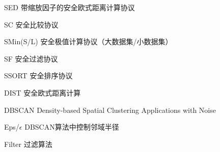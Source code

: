 \begin{denotation}
\item[SED] 带缩放因子的安全欧式距离计算协议
\item[SC] 安全比较协议
\item[SMin(S/L)] 安全极值计算协议（大数据集/小数据集）
\item[SF] 安全过滤协议
\item[SSORT] 安全排序协议
\item[DIST] 安全欧式距离计算
\item[DBSCAN] Density-based Spatial Clustering Applications with Noise
\item[Eps/$ \epsilon $] DBSCAN算法中控制邻域半径
\item[Filter] 过滤算法
%	

\end{denotation}
